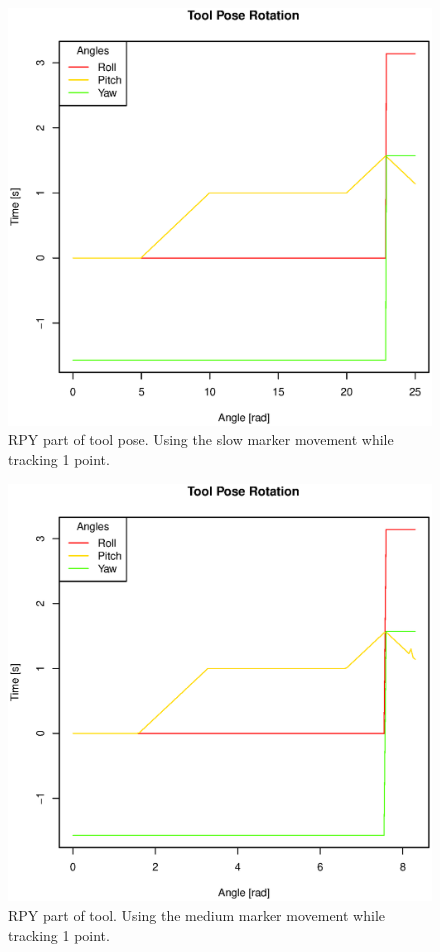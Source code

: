 \begin{figure}[H]
\centering
\includegraphics[width= \linewidth]{graphics/robotics/toolPose_slow_1pt}
\caption{RPY part of tool pose. Using the slow marker movement while tracking 1 point.}
\label{fig:toolpose_slow_1p_rpy}
\end{figure}

\begin{figure}[H]
\centering
\includegraphics[width= \linewidth]{graphics/robotics/toolPose_medium_1pt}
\caption{RPY part of tool. Using the medium marker movement while tracking 1 point.}
\label{fig:toolpose_medium_1p_rpy}
\end{figure}

